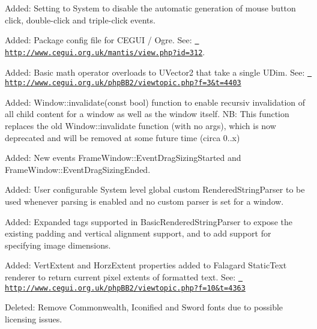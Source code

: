 \begin{DoxyItemize}
\item Added\+: Setting to System to disable the automatic generation of mouse button click, double-\/click and triple-\/click events.
\item Added\+: Package config file for C\+E\+G\+UI / Ogre. See\+: \href{http://www.cegui.org.uk/mantis/view.php?id=312}{\texttt{ http\+://www.\+cegui.\+org.\+uk/mantis/view.\+php?id=312}}.
\item Added\+: Basic math operator overloads to U\+Vector2 that take a single U\+Dim. See\+: \href{http://www.cegui.org.uk/phpBB2/viewtopic.php?f=3&t=4403}{\texttt{ http\+://www.\+cegui.\+org.\+uk/php\+B\+B2/viewtopic.\+php?f=3\&t=4403}}
\item Added\+: Window\+::invalidate(const bool) function to enable recursiv invalidation of all child content for a window as well as the window itself. NB\+: This function replaces the old Window\+::invalidate function (with no args), which is now deprecated and will be removed at some future time (circa 0..\+x)
\item Added\+: New events Frame\+Window\+::\+Event\+Drag\+Sizing\+Started and Frame\+Window\+::\+Event\+Drag\+Sizing\+Ended.
\item Added\+: User configurable System level global custom Rendered\+String\+Parser to be used whenever parsing is enabled and no custom parser is set for a window.
\item Added\+: Expanded tags supported in Basic\+Rendered\+String\+Parser to expose the existing padding and vertical alignment support, and to add support for specifying image dimensions.
\item Added\+: Vert\+Extent and Horz\+Extent properties added to Falagard Static\+Text renderer to return current pixel extents of formatted text. See\+: \href{http://www.cegui.org.uk/phpBB2/viewtopic.php?f=10&t=4363}{\texttt{ http\+://www.\+cegui.\+org.\+uk/php\+B\+B2/viewtopic.\+php?f=10\&t=4363}}
\item Deleted\+: Remove Commonwealth, Iconified and Sword fonts due to possible licensing issues.
\end{DoxyItemize}


